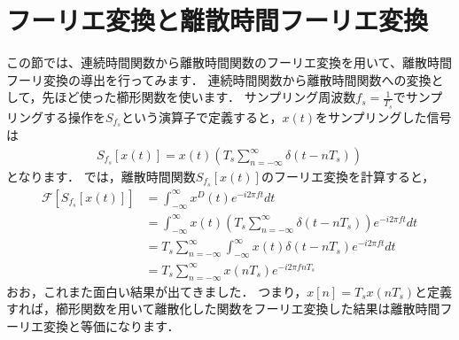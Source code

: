 \section{フーリエ変換と離散時間フーリエ変換}

この節では、連続時間関数から離散時間関数のフーリエ変換を用いて、離散時間フーリ変換の導出を行ってみます．
連続時間関数から離散時間関数への変換として，先ほど使った櫛形関数を使います．
サンプリング周波数$f_s=\frac{1}{T_s}$でサンプリングする操作を$S_{f_s}$という演算子で定義すると，$x(t)$をサンプリングした信号は
\begin{align}
S_{f_s}[x(t)] = x(t) \left(T_s \sum_{n=-\infty}^{\infty} \delta\left(t- nT_s\right) \right)
\end{align}
となります．
では，離散時間関数$S_{f_s}[x(t)]$のフーリエ変換を計算すると，
\begin{align}
\mathcal{F}[S_{f_s}[x(t)]] &= \int_{-\infty}^{\infty} x^D(t) e^{-i2\pi ft} dt\nonumber\\
    &= \int_{-\infty}^{\infty} x(t) \left(T_s \sum_{n=-\infty}^{\infty} \delta\left(t- nT_s\right) \right) e^{-i2\pi ft} dt \nonumber\\
    &= T_s \sum_{n=-\infty}^{\infty} \int_{-\infty}^{\infty} x(t) \delta\left(t- nT_s\right) e^{-i2\pi ft} dt \nonumber\\
    &= T_s \sum_{n=-\infty}^{\infty} x\left(nT_s\right) e^{-i2\pi fnT_s}
\end{align}
おお，これまた面白い結果が出てきました．
つまり，$x[n]=T_s x(nT_s)$と定義すれば，櫛形関数を用いて離散化した関数をフーリエ変換した結果は離散時間フーリエ変換と等価になります．

